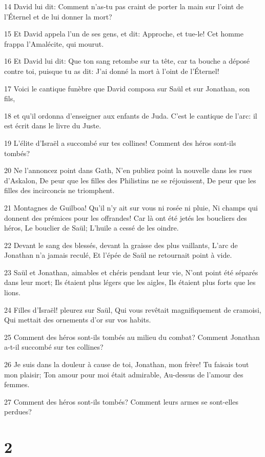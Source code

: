\par 14 David lui dit: Comment n'as-tu pas craint de porter la main sur l'oint de l'Éternel et de lui donner la mort?
\par 15 Et David appela l'un de ses gens, et dit: Approche, et tue-le! Cet homme frappa l'Amalécite, qui mourut.
\par 16 Et David lui dit: Que ton sang retombe sur ta tête, car ta bouche a déposé contre toi, puisque tu as dit: J'ai donné la mort à l'oint de l'Éternel!
\par 17 Voici le cantique funèbre que David composa sur Saül et sur Jonathan, son fils,
\par 18 et qu'il ordonna d'enseigner aux enfants de Juda. C'est le cantique de l'arc: il est écrit dans le livre du Juste.
\par 19 L'élite d'Israël a succombé sur tes collines! Comment des héros sont-ils tombés?
\par 20 Ne l'annoncez point dans Gath, N'en publiez point la nouvelle dans les rues d'Askalon, De peur que les filles des Philistins ne se réjouissent, De peur que les filles des incirconcis ne triomphent.
\par 21 Montagnes de Guilboa! Qu'il n'y ait sur vous ni rosée ni pluie, Ni champs qui donnent des prémices pour les offrandes! Car là ont été jetés les boucliers des héros, Le bouclier de Saül; L'huile a cessé de les oindre.
\par 22 Devant le sang des blessés, devant la graisse des plus vaillants, L'arc de Jonathan n'a jamais reculé, Et l'épée de Saül ne retournait point à vide.
\par 23 Saül et Jonathan, aimables et chéris pendant leur vie, N'ont point été séparés dans leur mort; Ils étaient plus légers que les aigles, Ils étaient plus forts que les lions.
\par 24 Filles d'Israël! pleurez sur Saül, Qui vous revêtait magnifiquement de cramoisi, Qui mettait des ornements d'or sur vos habits.
\par 25 Comment des héros sont-ils tombés au milieu du combat? Comment Jonathan a-t-il succombé sur tes collines?
\par 26 Je suis dans la douleur à cause de toi, Jonathan, mon frère! Tu faisais tout mon plaisir; Ton amour pour moi était admirable, Au-dessus de l'amour des femmes.
\par 27 Comment des héros sont-ils tombés? Comment leurs armes se sont-elles perdues?

\chapter{2}

